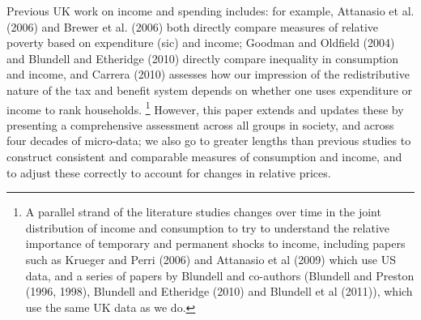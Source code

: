 Previous UK work on income and spending includes: for example, Attanasio et al. (2006) and Brewer et al. (2006) both directly compare measures of relative poverty based on expenditure (sic) and income; Goodman and Oldfield (2004) and Blundell and Etheridge (2010) directly compare inequality in consumption and income, and Carrera (2010) assesses how our impression of the redistributive nature of the tax and benefit system depends on whether one uses expenditure or income to rank households. \footnote{A parallel strand of the literature studies changes over time in the joint distribution of income and consumption to try to understand the relative importance of temporary and permanent shocks to income, including papers such as Krueger and Perri (2006) and Attanasio et al (2009) which use US data, and a series of papers by Blundell and co-authors (Blundell and Preston (1996, 1998), Blundell and Etheridge (2010) and Blundell et al (2011)), which use the same UK data as we do.} However, this paper extends and updates these by presenting a comprehensive assessment across all groups in society, and across four decades of micro-data; we also go to greater lengths than previous studies to construct consistent and comparable measures of consumption and income, and to adjust these correctly to account for changes in relative prices.

